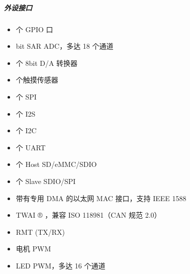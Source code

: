 \documentclass[a4paper,12pt,english]{sphinxmanual}
\begin{document}
\subparagraph{外设接口}
\label{\detokenize{dev-board/esp32:id5}}\begin{itemize}
\item {} 
 个 GPIO 口

\item {} 
\sphinxhyphen{}bit SAR ADC，多达 18 个通道

\item {} 
 个 8\sphinxhyphen{}bit D/A 转换器

\item {} 
 个触摸传感器

\item {} 
 个 SPI

\item {} 
 个 I2S

\item {} 
 个 I2C

\item {} 
 个 UART

\item {} 
 个 Host SD/eMMC/SDIO

\item {} 
 个 Slave SDIO/SPI

\item {} 
\sphinxAtStartPar
带有专用 DMA 的以太网 MAC 接口，支持 IEEE 1588

\item {} 
\sphinxAtStartPar
TWAI ® ，兼容 ISO 11898\sphinxhyphen{}1（CAN 规范 2.0）

\item {} 
\sphinxAtStartPar
RMT (TX/RX)

\item {} 
\sphinxAtStartPar
电机 PWM

\item {} 
\sphinxAtStartPar
LED PWM，多达 16 个通道

\end{itemize}
\end{document}
